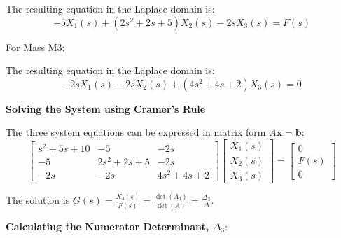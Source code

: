 \documentclass[11pt]{article}
\begin{document}
The resulting equation in the Laplace domain is:
\begin{equation}
-5X_1(s) + (2s^2 + 2s + 5)X_2(s) - 2sX_3(s) = F(s) \tag{2}
\end{equation}

{For Mass M3:}
\begin{figure}[h!]
\centering
{}
\end{figure}

The resulting equation in the Laplace domain is:
\begin{equation}
-2sX_1(s) - 2sX_2(s) + (4s^2 + 4s + 2)X_3(s) = 0 \tag{3}
\end{equation}

\noindent\textbf{Solving the System using Cramer's Rule}
\vspace{12pt}

The three system equations can be expressed in matrix form $A\mathbf{x} = \mathbf{b}$:
$$
\begin{bmatrix}
s^2+5s+10 & -5 & -2s \\
-5 & 2s^2+2s+5 & -2s \\
-2s & -2s & 4s^2+4s+2
\end{bmatrix}
\begin{bmatrix}
X_1(s) \\
X_2(s) \\
X_3(s)
\end{bmatrix}
=
\begin{bmatrix}
0 \\
F(s) \\
0
\end{bmatrix}
$$

The solution is $G(s) = \frac{X_3(s)}{F(s)} = \frac{\det(A_3)}{\det(A)} = \frac{\Delta_3}{\Delta}$.

\vspace{12pt}
\noindent\textbf{Calculating the Numerator Determinant, $\Delta_3$}:
\vspace{12pt}
\end{document}
